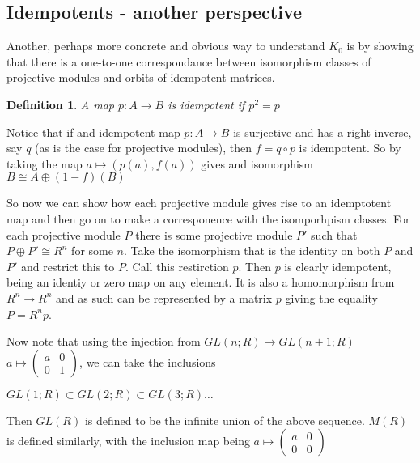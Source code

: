 \documentclass[a4paper,10pt]{article}
\newtheorem{defn}[thm]{Definition}
\begin{document}
\subsection{Idempotents - another perspective}
	Another, perhaps more concrete and obvious way to understand $K_{0}$ is by showing that there is a one-to-one correspondance between isomorphism classes of projective modules and orbits of idempotent matrices.

\begin{defn}
	A map $p:A\rightarrow B$ is idempotent if $p^2=p$
\end{defn}

Notice that if and idempotent map $p:A\rightarrow B$ is surjective and has a right inverse, say $q$ (as is the case for projective modules), then $f=q\circ p$ is idempotent. So by taking the map $a\mapsto (p(a), f(a))$ gives and isomorphism $B\cong A\oplus (1-f)(B)$

So now we can show how each projective module gives rise to an idemptotent map and then go on to make a corresponence with the isomporhpism classes. For each projective module $P$ there is some projective module $P'$ such that $P\oplus P'\cong R^{n}$ for some $n$. Take the isomorphism that is the identity on both $P$ and $P'$ and restrict this to $P$. Call this restirction $p$. Then $p$ is clearly idempotent, being an identiy or zero map on any element. It is also a homomorphism from $R^{n}\rightarrow R^{n}$ and as such can be represented by a matrix $p$ giving the equality $P=R^{n}p$.

Now note that using the injection from $GL(n;R)\rightarrow GL(n+1;R)$ $a\mapsto \left( \begin{array}{cc} a & 0 \\ 0 & 1 \end{array}\right)$, we can take the inclusions

\begin{center}
	$GL(1;R)\subset GL(2;R)\subset GL(3;R)\dots$
\end{center}

Then $GL(R)$ is defined to be the infinite union of the above sequence. 
\newline $M(R)$ is defined similarly, with the inclusion map being $a\mapsto \left( \begin{array}{cc} a & 0 \\ 0 & 0 \end{array}\right)$
\end{document}
